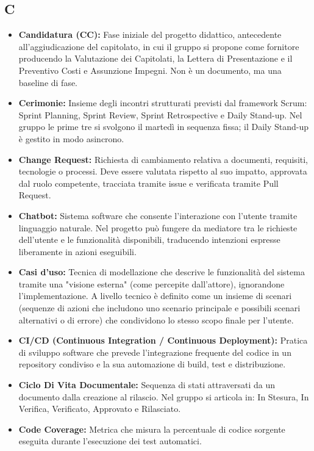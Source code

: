 {}
\subsection*{C}
\begin{itemize}[leftmargin=*]
      \item \textbf{Candidatura (CC):} Fase iniziale del progetto didattico, antecedente all'aggiudicazione del capitolato, in cui il gruppo si propone come fornitore producendo la Valutazione dei Capitolati, la Lettera di Presentazione e il Preventivo Costi e Assunzione Impegni. Non è un documento, ma una baseline di fase.      
      \item \textbf{Cerimonie:} Insieme degli incontri strutturati previsti dal
      framework Scrum: Sprint Planning, Sprint Review, Sprint
      Retrospective e Daily Stand-up. Nel gruppo le prime tre si svolgono il martedì in sequenza fissa; il Daily Stand-up è gestito in modo asincrono.
      \item \textbf{Change Request:} Richiesta di cambiamento relativa a documenti, requisiti, tecnologie o processi. Deve essere valutata rispetto al suo impatto, approvata dal ruolo competente, tracciata tramite issue e verificata tramite Pull Request.
      \item \textbf{Chatbot:} Sistema software che consente l'interazione con l'utente tramite linguaggio naturale. Nel progetto può fungere da mediatore tra le richieste dell'utente e le funzionalità disponibili, traducendo intenzioni espresse liberamente in azioni eseguibili.
      \item \textbf{Casi d'uso:} Tecnica di modellazione che descrive le funzionalità del sistema tramite una "visione esterna" (come percepite dall'attore), ignorandone l'implementazione. A livello tecnico è definito come un insieme di scenari (sequenze di azioni che includono uno scenario principale e possibili scenari alternativi o di errore) che condividono lo stesso scopo finale per l'utente.
      \item  \textbf{CI/CD (Continuous Integration / Continuous Deployment):} Pratica di sviluppo software che prevede l’integrazione frequente del codice in un repository condiviso e la sua automazione di build, test e distribuzione.
      \item \textbf{Ciclo Di Vita Documentale:} Sequenza di stati attraversati da un documento dalla creazione al rilascio. Nel gruppo si articola in: In Stesura, In Verifica, Verificato, Approvato e Rilasciato.      \item \textbf{Code Coverage:} Metrica che misura la percentuale di codice sorgente eseguita durante l’esecuzione dei test automatici.

\end{itemize}
